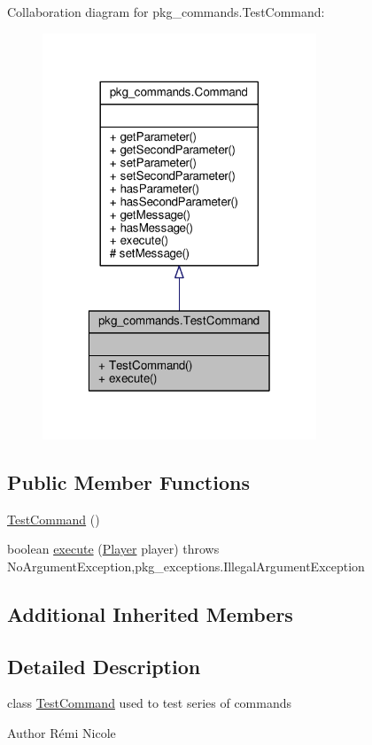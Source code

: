Collaboration diagram for pkg\-\_\-commands.\-Test\-Command\-:
\nopagebreak
\begin{figure}[H]
\begin{center}
\leavevmode
\includegraphics[width=232pt]{classpkg__commands_1_1TestCommand__coll__graph}
\end{center}
\end{figure}
\subsection*{Public Member Functions}
\begin{DoxyCompactItemize}
\item 
\hyperlink{classpkg__commands_1_1TestCommand_a116f412bc5f67f0c344e436d33126f25}{Test\-Command} ()
\item 
boolean \hyperlink{classpkg__commands_1_1TestCommand_a1ff07c27a46910d20c2e4569888892ca}{execute} (\hyperlink{classpkg__world_1_1Player}{Player} player)  throws No\-Argument\-Exception,pkg\-\_\-exceptions.\-Illegal\-Argument\-Exception 
\end{DoxyCompactItemize}
\subsection*{Additional Inherited Members}


\subsection{Detailed Description}
class \hyperlink{classpkg__commands_1_1TestCommand}{Test\-Command} used to test series of commands \begin{DoxyAuthor}{Author}
Rémi Nicole 
\end{DoxyAuthor}


